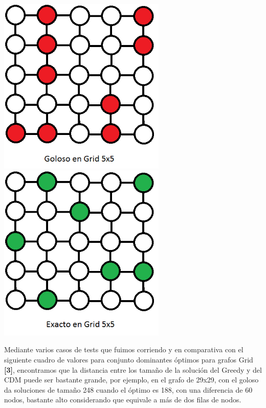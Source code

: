 \includegraphics[width=8cm]{./graficos/grid_5x5_goloso.png}
\includegraphics[width=8cm]{./graficos/grid_5x5_exacto.png}

Mediante varios casos de tests que fuimos corriendo y en comparativa con el  siguiente cuadro de valores para conjunto dominantes óptimos para grafos Grid \textbf{[3]}, encontramos que la distancia entre los tamaño de la solución
del Greedy y del CDM puede ser bastante grande, por ejemplo, en el grafo de 29x29, con el goloso da soluciones de tamaño 248 cuando el óptimo es 188, con una diferencia de 60 nodos, bastante alto considerando que equivale a más de dos filas de nodos.\\

